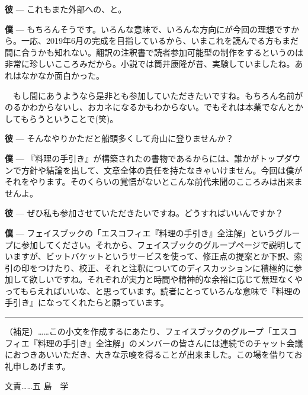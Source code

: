 \documentclass[14Q,]{ltjsbook}
\renewcommand{\ldots}{\noindent…}
\begin{document}
\textbf{彼} --- これもまた外部への、と。

\textbf{僕} ---
もちろんそうです。いろんな意味で、いろんな方向にが今回の理想ですから。一応、2019年6月の完成を目指しているから、いまこれを読んでる方もまだ間に合うかも知れない。翻訳の注釈書で読者参加可能型の制作をするというのは非常に珍しいこころみだから。小説では筒井康隆が昔、実験していましたね。あれはなかなか面白かった。

　もし間にあうようなら是非とも参加していただきたいですね。もちろん名前がのるかわからないし、おカネになるかもわからない。でもそれは本業でなんとかしてもらうということで(笑)。

\textbf{彼} --- そんなやりかただと船頭多くして舟山に登りませんか？

\textbf{僕} ---
『料理の手引き』が構築されたの書物であるからには、誰かがトップダウンで方針や結論を出して、文章全体の責任を持たなきゃいけません。今回は僕がそれをやります。そのくらいの覚悟がないとこんな前代未聞のこころみは出来ませんよ。

\textbf{彼} ---
ぜひ私も参加させていただきたいですね。どうすればいいんですか？

\textbf{僕} ---
フェイスブックの「エスコフィエ『料理の手引き』全注解」というグループに参加してください。それから、フェイスブックのグループページで説明していますが、ビットバケットというサービスを使って、修正点の提案とか下訳、索引の印をつけたり、校正、それと注釈についてのディスカッションに積極的に参加して欲しいですね。それぞれが実力と時間や精神的な余裕に応じて無理なくやってもらえればいいな、と思っています。読者にとっていろんな意味で『料理の手引き』になってくれたらと願っています。

\begin{center}\rule{0.5\linewidth}{\linethickness}\end{center}

（補足）\ldots{}\ldots{}この小文を作成するにあたり、フェイスブックのグループ「エスコフィエ『料理の手引き』全注解」のメンバーの皆さんには連続でのチャット会議におつきあいいただき、大きな示唆を得ることが出来ました。この場を借りてお礼申しあげます。

文責\ldots{}\ldots{}五 島　学

\backmatter



\renewcommand{\indexname}{総索引}
\printindex
\end{document}
